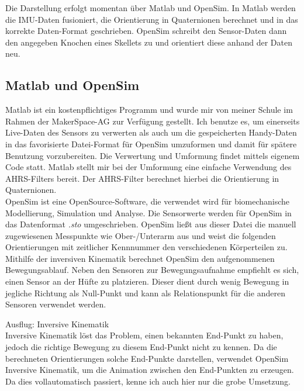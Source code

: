 Die Darstellung erfolgt momentan über Matlab und OpenSim. In Matlab werden die IMU-Daten
fusioniert, die Orientierung in Quaternionen berechnet und in das korrekte Daten-Format geschrieben. 
OpenSim schreibt den Sensor-Daten dann den angegeben Knochen eines Skellets zu und orientiert diese anhand 
der Daten neu.

\subsection{Matlab und OpenSim}
Matlab ist ein kostenpflichtiges Programm und wurde mir von meiner Schule im Rahmen der MakerSpace-AG zur Verfügung 
gestellt. Ich benutze es, um einerseits Live-Daten des Sensors zu verwerten als auch um die gespeicherten Handy-Daten 
in das favorisierte Datei-Format für OpenSim
umzuformen und damit für spätere Benutzung vorzubereiten. Die Verwertung und Umformung findet mittels eigenem Code statt.
Matlab stellt mir bei der Umformung eine einfache Verwendung des AHRS-Filters
bereit. Der AHRS-Filter berechnet hierbei die Orientierung in Quaternionen. \\ 
OpenSim ist eine OpenSource-Software, die verwendet wird für biomechanische Modellierung, Simulation und Analyse. 
Die Sensorwerte werden für OpenSim in das Datenformat \textit{.sto} umgeschrieben. OpenSim ließt aus dieser Datei die 
manuell zugewiesenen Messpunkte wie Ober-/Unterarm aus und weist die folgenden Orientierungen mit zeitlicher Kennnummer
den verschiedenen Körperteilen zu. Mithilfe der inversiven Kinematik berechnet OpenSim den aufgenommenen Bewegungsablauf.
Neben den Sensoren zur Bewegungsaufnahme empfiehlt es sich, einen Sensor an der Hüfte zu platzieren. Dieser dient durch
wenig Bewegung in jegliche Richtung als Null-Punkt und kann als Relationspunkt für die anderen Sensoren verwendet werden.

{\Large Ausflug: Inversive Kinematik}\\
Inversive Kinematik löst das Problem, einen bekannten End-Punkt zu haben, jedoch die richtige 
Bewegung zu diesem End-Punkt nicht zu kennen. Da die berechneten Orientierungen solche End-Punkte darstellen, verwendet 
OpenSim Inversive Kinematik, um die Animation zwischen den End-Punkten zu erzeugen. Da dies vollautomatisch passiert, 
kenne ich auch hier nur die grobe Umsetzung.